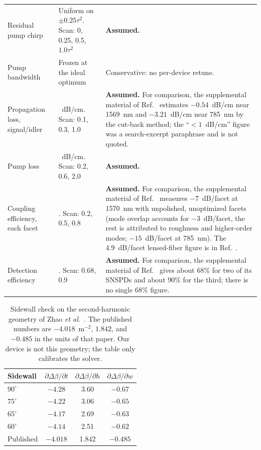 \documentclass[11pt,a4paper]{article}
\begin{document}
{\begin{longtable}{@{}>{\raggedright\arraybackslash}p{2.35cm}>{\raggedright\arraybackslash}p{6.15cm}>{\raggedright\arraybackslash}p{6.55cm}@{}}
Residual pump chirp & Uniform on $\pm 0.25\tau^{2}$. Scan: 0, 0.25, 0.5, $1.0\tau^{2}$ & \textbf{Assumed.} \\
Pump bandwidth & Frozen at the ideal optimum & Conservative: no per-device retune. \\
Propagation loss, signal/idler & 0.3~dB/cm. Scan: 0.1, 0.3, 1.0 & \textbf{Assumed.} For comparison, the supplemental material of Ref.~\cite{Zhao2020} estimates $-0.54$~dB/cm near 1569~nm and $-3.21$~dB/cm near 785~nm by the cut-back method; the ``$<1$~dB/cm'' figure was a search-excerpt paraphrase and is not quoted. \\
Pump loss & 0.6~dB/cm. Scan: 0.2, 0.6, 2.0 & \textbf{Assumed.} \\
Coupling efficiency, each facet & 0.5. Scan: 0.2, 0.5, 0.8 & \textbf{Assumed.} For comparison, the supplemental material of Ref.~\cite{Zhao2020} measures $-7$~dB/facet at 1570~nm with unpolished, unoptimized facets (mode overlap accounts for $-3$~dB/facet, the rest is attributed to roughness and higher-order modes; $-15$~dB/facet at 785~nm). The 4.9~dB/facet lensed-fiber figure is in Ref.~\cite{Shi2024}. \\
Detection efficiency & 0.8. Scan: 0.68, 0.9 & \textbf{Assumed.} For comparison, the supplemental material of Ref.~\cite{Zhao2020} gives about 68\% for two of its SNSPDs and about 90\% for the third; there is no single 68\% figure. \\
\end{longtable}
}


\begin{table}[ht]
\centering
\caption{Sidewall check on the second-harmonic geometry of Zhao \emph{et al.}\ \cite{ZhaoLu2023}.
The published numbers are $-4.018$~\textmu m$^{-2}$, $1.842$, and $-0.485$ in the units of that paper.
Our device is not this geometry; the table only calibrates the solver.}
\label{tab:calib}
\begin{tabular}{lccc}
\toprule
Sidewall & $\partial\Delta\beta/\partial t$ & $\partial\Delta\beta/\partial h$ & $\partial\Delta\beta/\partial w$ \\
\midrule
$90^{\circ}$ & $-4.28$ & 3.60 & $-0.67$ \\
$75^{\circ}$ & $-4.22$ & 3.06 & $-0.65$ \\
$65^{\circ}$ & $-4.17$ & 2.69 & $-0.63$ \\
$60^{\circ}$ & $-4.14$ & 2.51 & $-0.62$ \\
Published \cite{ZhaoLu2023} & $-4.018$ & 1.842 & $-0.485$ \\
\bottomrule
\end{tabular}
\end{table}
\end{document}
